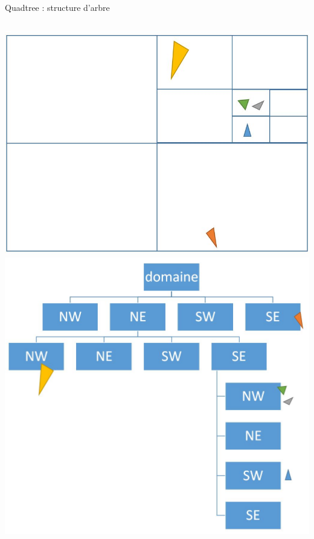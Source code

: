 \documentclass[aspectratio=169, 12pt, a4paper, hyperref={pdfauthor={Alexandre MARIN}, pdfkeywords={IFPEN, Delaunay, Voronoi, mesh generation}, colorlinks=true, linkcolor=purple, urlcolor=blue, citecolor=magenta}]{beamer}
\begin{document}
\begin{Energie}{Quadtree : structure d'arbre}

\begin{columns}[c]
\column{4cm}
\includegraphics[scale=0.28]{boundingBoxes.jpg}
\column{8cm}
\includegraphics[scale=0.35]{quadtree.jpg}
\end{columns}
\end{Energie}
\end{document}
